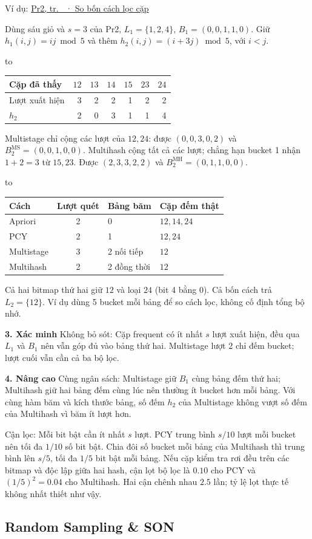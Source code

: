 \documentclass[10pt,a4paper,twocolumn]{article}
\newif\ifexamheadingprinted
\newcommand{\topic}[2]{%
  \global\examheadingprintedfalse\par\subsection{#2}\label{topic:#1}}
\newcommand{\key}[1]{#1:\enspace}
\newcommand{\blocklabel}[1]{\par\noindent#1\par\nobreak}
\newcommand{\qlink}[2]{\hyperref[question:#1]{#2}}
\newenvironment{example}[2]{%
  \par\addvspace{6pt}\noindent
  \raggedright
  \blocklabel{Ví dụ: \qlink{#1}{#2}}%
}{\par\addvspace{4pt}}
\newenvironment{examtable}[1]{%
  \par\addvspace{2pt}\noindent\hbox to \linewidth\bgroup\hfil
  \setlength{\tabcolsep}{4pt}%
  \renewcommand{\arraystretch}{1.12}\begin{tabular}{#1}%
}{\end{tabular}\hfil\egroup\par\addvspace{2pt}}
\newcommand{\unitheading}[2]{%
  \par\addvspace{1pt}\noindent\textbf{#1. #2}\enspace}
\newcommand{\unitverification}{\unitheading{3}{Xác minh}}
\newcommand{\unitadvanced}{\unitheading{4}{Nâng cao}}
\begin{document}
\begin{example}{Pr2}{Pr2, tr.~\pageref*{question:Pr2} · So bốn cách lọc cặp}
Dùng sáu giỏ và $s=3$ của Pr2, $L_1=\{1,2,4\}$, $B_1=(0,0,1,1,0)$. Giữ $h_1(i,j)=ij\bmod5$ và thêm $h_2(i,j)=(i+3j)\bmod5$, với $i<j$.
\begin{examtable}{@{}lrrrrrr@{}}
\toprule
Cặp đã thấy & $12$ & $13$ & $14$ & $15$ & $23$ & $24$ \\
\midrule
Lượt xuất hiện & 3 & 2 & 2 & 1 & 2 & 2 \\
$h_2$ & 2 & 0 & 3 & 1 & 1 & 4 \\
\bottomrule
\end{examtable}
Multistage chỉ cộng các lượt của $12,24$: được $(0,0,3,0,2)$ và $B_2^{\mathrm{MS}}=(0,0,1,0,0)$. Multihash cộng tất cả các lượt; chẳng hạn bucket 1 nhận $1+2=3$ từ $15,23$. Được $(2,3,3,2,2)$ và $B_2^{\mathrm{MH}}=(0,1,1,0,0)$.
\begin{examtable}{@{}lcll@{}}
\toprule
Cách & Lượt quét & Bảng băm & Cặp đếm thật \\
\midrule
Apriori & 2 & 0 & $12,14,24$ \\
PCY & 2 & 1 & $12,24$ \\
Multistage & 3 & 2 nối tiếp & $12$ \\
Multihash & 2 & 2 đồng thời & $12$ \\
\bottomrule
\end{examtable}
Cả hai bitmap thứ hai giữ $12$ và loại $24$ (bit 4 bằng 0). Cả bốn cách trả $L_2=\{12\}$. Ví dụ dùng 5 bucket mỗi bảng để so cách lọc, không cố định tổng bộ nhớ.
\end{example}

\unitverification
\key{Không bỏ sót} Cặp frequent có ít nhất $s$ lượt xuất hiện, đều qua $L_1$ và $B_1$ nên vẫn góp đủ vào bảng thứ hai. Multistage lượt 2 chỉ đếm bucket; lượt cuối vẫn cần cả ba bộ lọc.

\unitadvanced
\key{Cùng ngân sách} Multistage giữ $B_1$ cùng bảng đếm thứ hai; Multihash giữ hai bảng đếm cùng lúc nên thường ít bucket hơn mỗi bảng. Với cùng hàm băm và kích thước bảng, số đếm $h_2$ của Multistage không vượt số đếm của Multihash vì băm ít lượt hơn.

\key{Cận lọc} Mỗi bit bật cần ít nhất $s$ lượt. PCY trung bình $s/10$ lượt mỗi bucket nên tối đa $1/10$ số bit bật. Chia đôi số bucket mỗi bảng của Multihash thì trung bình lên $s/5$, tối đa $1/5$ bit bật mỗi bảng. Nếu cặp kiểm tra rơi đều trên các bitmap và độc lập giữa hai hash, cận lọt bộ lọc là $0.10$ cho PCY và $(1/5)^2=0.04$ cho Multihash. Hai cận chênh nhau $2.5$ lần; tỷ lệ lọt thực tế không nhất thiết như vậy.
\topic{son}{Random Sampling \& SON}
\end{document}
